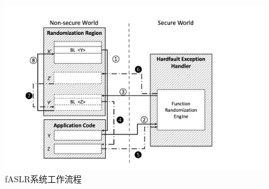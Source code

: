 \documentclass[12pt,a4paper]{ctexart}
\numberwithin{figure}{section}
\begin{document}
\begin{figure}[h]
    \centering
    \includegraphics[scale=0.8]{graph/workflow.png}
    \caption{fASLR系统工作流程}
\end{figure}
\end{document}
